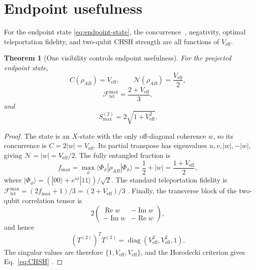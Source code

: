 \documentclass[reprint,aps,pra,superscriptaddress,nofootinbib,longbibliography]{revtex4-2}
\newtheorem{theorem}{Theorem}
\newcommand{\ket}[1]{|#1\rangle}
\newcommand{\bra}[1]{\langle #1|}
\newcommand{\Repart}{\operatorname{Re}}
\newcommand{\Impart}{\operatorname{Im}}
\newcommand{\diag}{\operatorname{diag}}
\newcommand{\Veff}{V_{\mathrm{eff}}}
\newcommand{\Ftel}{\mathcal F_{\mathrm{tel}}}
\newcommand{\Nneg}{\mathcal N}
\begin{document}
\section{Endpoint usefulness}

For the endpoint state \eqref{eq:endpoint-state}, the concurrence~\cite{Wootters1998}, negativity, optimal teleportation fidelity, and two-qubit CHSH strength are all functions of \(\Veff\).

\begin{theorem}[One visibility controls endpoint usefulness]
For the projected endpoint state,
\begin{equation}
C(\rho_{AB})=\Veff,
\qquad
\Nneg(\rho_{AB})=\frac{\Veff}{2},
\label{eq:C-N}
\end{equation}
\begin{equation}
\Ftel^{\max}=\frac{2+\Veff}{3},
\label{eq:Ftel}
\end{equation}
and
\begin{equation}
S_{\max}^{(2)}=2\sqrt{1+\Veff^2}.
\label{eq:CHSH}
\end{equation}
\end{theorem}

\begin{proof}
The state is an \(X\)-state with the only off-diagonal coherence \(w\), so its concurrence is \(C=2|w|=\Veff\).  Its partial transpose has eigenvalues \(u,v,|w|,-|w|\), giving \(\Nneg=|w|=\Veff/2\).  The fully entangled fraction is
\begin{equation}
f_{\max}=\max_\phi
\bra{\Phi_\phi}\rho_{AB}\ket{\Phi_\phi}
=\frac12+|w|=\frac{1+\Veff}{2},
\end{equation}
where \(\ket{\Phi_\phi}=(\ket{00}+e^{i\phi}\ket{11})/\sqrt2\).  The standard teleportation fidelity is \(\Ftel^{\max}=(2f_{\max}+1)/3=(2+\Veff)/3\) \cite{Bennett1993,Horodecki1999}.  Finally, the transverse block of the two-qubit correlation tensor is
\begin{equation}
2\begin{pmatrix}
\Repart w&-\Impart w\\
-\Impart w&-\Repart w
\end{pmatrix},
\end{equation}
and hence
\begin{equation}
\left(T^{(2)}\right)^T T^{(2)}
=\diag(\Veff^2,\Veff^2,1).
\end{equation}
The singular values are therefore \(\{1,\Veff,\Veff\}\), and the Horodecki criterion gives Eq.~\eqref{eq:CHSH} \cite{Horodecki1995}.
\end{proof}
\end{document}
